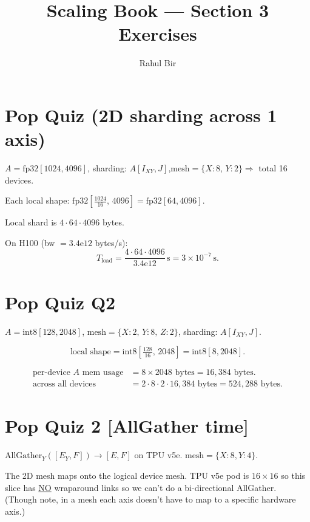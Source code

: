 \documentclass[11pt]{article}
\title{Scaling Book --- Section 3 Exercises}
\author{Rahul Bir}
\date{}
\begin{document}
\maketitle

\section*{Pop Quiz (2D sharding across 1 axis)}

$A = \text{fp32}[1024, 4096]$, \quad sharding: $A[I_{XY}, J]$,\quad $\text{mesh} = \{X{:}8,\, Y{:}2\} \Rightarrow$ total 16 devices.

Each local shape: $\text{fp32}\left[\tfrac{1024}{16},\, 4096\right] = \text{fp32}[64, 4096]$.

Local shard is $4 \cdot 64 \cdot 4096$ bytes.

On H100 (bw $= 3.4\mathrm{e}12$ bytes/s):
\[
T_{\text{load}} = \frac{4 \cdot 64 \cdot 4096}{3.4\mathrm{e}12}\,\text{s} = 3 \times 10^{-7}\,\text{s}.
\]

\section*{Pop Quiz Q2}

$A = \text{int8}[128, 2048]$, \quad $\text{mesh} = \{X{:}2,\, Y{:}8,\, Z{:}2\}$, \quad sharding: $A[I_{XY}, J]$.

\[
\text{local shape} = \text{int8}\!\left[\tfrac{128}{16},\, 2048\right] = \text{int8}[8, 2048].
\]

\begin{align*}
\text{per-device } A \text{ mem usage} &= 8 \times 2048 \text{ bytes} = 16{,}384 \text{ bytes}. \\
\text{across all devices} &= 2 \cdot 8 \cdot 2 \cdot 16{,}384 \text{ bytes} = 524{,}288 \text{ bytes}.
\end{align*}

\section*{Pop Quiz 2 [AllGather time]}

$\text{AllGather}_Y([E_Y, F]) \to [E, F]$ on TPU v5e. $\text{mesh} = \{X{:}8, Y{:}4\}$.

The 2D mesh maps onto the logical device mesh. TPU v5e pod is $16 \times 16$ so this slice has \underline{NO} wraparound links so we can't do a bi-directional AllGather. (Though note, in a mesh each axis doesn't have to map to a specific hardware axis.)
\end{document}
